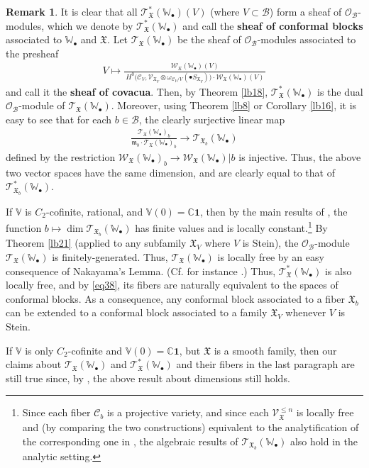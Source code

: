 \documentclass[12pt,a4paper,notitlepage]{article}
\theoremstyle{definition}
\newtheorem{rem}[df]{Remark}
\theoremstyle{plain}
\newcommand{\fk}{\mathfrak}
\newcommand{\mc}{\mathcal}
\newcommand{\id}{\mathbf{1}}
\newcommand{\scr}{\mathscr}
\newcommand{\blt}{\bullet}
\newcommand{\Vbb}{\mathbb V}
\newcommand{\Wbb}{\mathbb W}
\newcommand{\Cbb}{\mathbb C}
\numberwithin{equation}{section}
\begin{document}
\begin{rem}\label{lb22}
It is clear that all $\scr T_{\fk X}^*(\Wbb_\blt)(V)$ (where $V\subset\mc B$) form a sheaf of $\scr O_{\mc B}$-modules, which we denote by $\scr T_{\fk X}^*(\Wbb_\blt)$ \index{T@$\scr T_{\fk X}^*(\Wbb_\blt),\scr T_{\fk X}^*(\Wbb_\blt)(\mc B)$} and call the \textbf{sheaf of conformal blocks} associated to $\Wbb_\blt$ and $\fk X$. Let $\scr T_{\fk X}(\Wbb_\blt)$ be the sheaf of $\scr O_{\mc B}$-modules associated to the presheaf
\begin{align*}
V\mapsto \frac{\scr W_{\fk X}(\Wbb_\blt)(V)} {~H^0\big(\mc C_V,\scr V_{\fk X_V}\otimes\omega_{\mc C_V/V}(\blt S_{\fk X_V})\big)\cdot \scr W_{\fk X}(\Wbb_\blt)(V)~}
\end{align*}
and call it the \textbf{sheaf of covacua}. Then, by Theorem \ref{lb18}, $\scr T_{\fk X}^*(\Wbb_\blt)$ is the dual $\scr O_{\mc B}$-module of $\scr T_{\fk X}(\Wbb_\blt)$. Moreover, using Theorem \ref{lb8} or Corollary \ref{lb16}, it is easy to see that for each $b\in\mc B$, the clearly surjective linear map
\begin{align}
\frac{\scr T_{\fk X}(\Wbb_\blt)_b}{\fk m_b\cdot \scr T_{\fk X}(\Wbb_\blt)_b}\rightarrow\scr T_{\fk X_b}(\Wbb_\blt)\label{eq38}
\end{align}
defined by the restriction $\scr W_{\fk X}(\Wbb_\blt)_b\rightarrow \scr W_{\fk X}(\Wbb_\blt)|b$ is injective. Thus, the above two vector spaces have the same dimension, and are clearly equal to that of $\scr T_{\fk X_b}^*(\Wbb_\blt)$.

If $\Vbb$ is $C_2$-cofinite, rational, and $\Vbb(0)=\Cbb\id$, then by the main results of \cite{DGT19b}, the function $b\mapsto \dim\scr T_{\fk X_b}(\Wbb_\blt)$ has finite values and is locally constant.\footnote{Since each  fiber $\mc C_b$ is a projective variety, and since each $\scr V_{\fk X}^{\leq n}$ is locally free and (by comparing the two constructions) equivalent to the analytification of the corresponding one in \cite{DGT19a,DGT19b},  the algebraic results of $\scr T_{\fk X_b}(\Wbb_\blt)$ also hold in the analytic setting.} By Theorem \ref{lb21} (applied to any subfamily $\fk X_V$ where $V$ is Stein), the $\scr O_{\mc B}$-module $\scr T_{\fk X}(\Wbb_\blt)$ is finitely-generated. Thus, $\scr T_{\fk X}(\Wbb_\blt)$ is locally free by an easy consequence of Nakayama's Lemma. (Cf. for instance \cite[Lemma III.1.6]{BS76}.) Thus, $\scr T_{\fk X}^*(\Wbb_\blt)$ is also locally free, and by \eqref{eq38}, its fibers are naturally equivalent to the spaces of conformal blocks. As a consequence, any conformal block associated to a fiber $\fk X_b$ can be extended to a conformal block associated to a family $\fk X_V$ whenever $V$ is Stein.



If $\Vbb$ is only $C_2$-cofinite and $\Vbb(0)=\Cbb\id$, but $\fk X$ is a smooth family, then our claims about $\scr T_{\fk X}(\Wbb_\blt)$ and $\scr T_{\fk X}^*(\Wbb_\blt)$ and their fibers in the last paragraph are still true since,  by \cite{DGT19b}, the above result about dimensions still holds. 
\end{rem}
\end{document}
